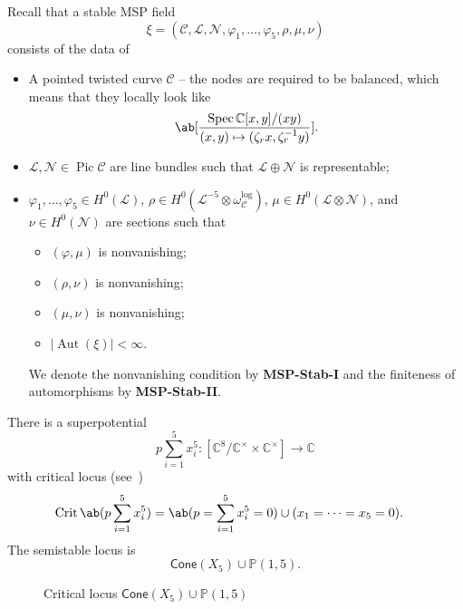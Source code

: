 \documentclass[10pt]{amsart}
\theoremstyle{definition}
\theoremstyle{remark}
\theoremstyle{plain}
\theoremstyle{definition}
\theoremstyle{remark}
\newcommand{\C}{\mathbb{C}}
\renewcommand{\P}{\mathbb{P}}
\newcommand{\mc}[1]{\mathcal{#1}}
\newcommand{\on}[1]{\operatorname{#1}}
\newcommand{\ms}[1]{\mathsf{#1}}
\newcommand{\1}{\mathbf{1}}
\newcommand{\2}{\mathbf{2}}
\newcommand{\3}{\mathbf{3}}
\DeclareMathOperator{\Aut}{Aut}
\DeclareMathOperator{\Pic}{Pic}
\DeclareMathOperator{\Spec}{Spec}
\begin{document}
Recall that a stable MSP field
\[ \xi = (\mc{C}, \mc{L}, \mc{N}, \varphi_1, \ldots, \varphi_5, \rho, \mu, \nu) \]
consists of the data of
\begin{itemize}
    \item A pointed twisted curve $\mc{C}$ -- the nodes are required to be balanced, which means that they locally look like
        \[ \ab[\frac{\Spec \C[x,y]/(xy)}{(x,y) \mapsto (\zeta_r x, \zeta_r^{-1}y)}]. \]
    \item $\mc{L}, \mc{N} \in \Pic \mc{C}$ are line bundles such that $\mc{L} \oplus \mc{N}$ is representable;
    \item $\varphi_1, \ldots, \varphi_5 \in H^0(\mc{L})$, $\rho \in H^0(\mc{L}^{-5} \otimes \omega_{\mc{C}}^{\log})$, $\mu \in H^0(\mc{L} \otimes \mc{N})$, and $\nu \in H^0(\mc{N})$ are sections such that
        \begin{itemize}
            \item $(\varphi, \mu)$ is nonvanishing;
            \item $(\rho, \nu)$ is nonvanishing;
            \item $(\mu, \nu)$ is nonvanishing;
            \item $|\Aut(\xi)|< \infty$.
        \end{itemize}
        We denote the nonvanishing condition by \textbf{MSP-Stab-I} and the finiteness of automorphisms by \textbf{MSP-Stab-II}.
\end{itemize}
There is a superpotential
\[ p \sum_{i=1}^5 x_i^5 \colon [\C^8 / \C^{\times} \times \C^{\times}] \to \C \]
with critical locus (see~)
\begin{align*}
    \on{Crit} \ab(p \sum_{i=1}^5 x_i^5) &= \ab(p = \sum_{i=1}^5 x_i^5 = 0) \cup (x_1 = \cdots = x_5 = 0).
\end{align*}
The semistable locus is
\[ \ms{Cone}(X_5) \cup \P(1,5).\]
\begin{figure}[htpb]
\begin{center}
\end{center}
\caption{Critical locus $\ms{Cone}(X_5) \cup \P(1,5)$}%
\label{fig:crit}
\end{figure}
\end{document}
